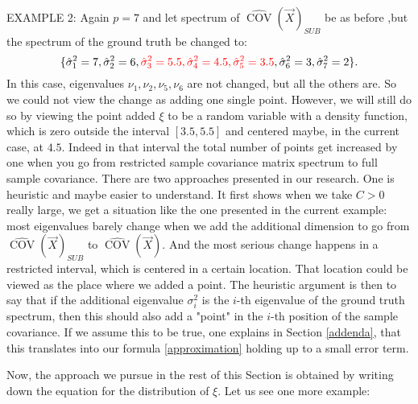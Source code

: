 \documentclass[12pt]{amsart}
\theoremstyle{definition}
\DeclareMathOperator{\Cov}{COV}
\numberwithin{equation}{section}
\numberwithin{equation}{section}
\theoremstyle{remark}
\numberwithin{equation}{section}
\begin{document}
EXAMPLE 2: Again $p=7$ and let spectrum of $\hat{\Cov}(\vec{X})_{SUB}$
be as before ,but the spectrum of the ground truth be changed to:
$$\{\hat{\sigma}^2_1=7,\hat{\sigma}^2_2=6,{\color{red}\hat{\sigma}^2_3=5.5,\hat{\sigma}^2_4=4.5,\hat{\sigma}^2_5=3.5},\hat{\sigma}^2_6=3,\hat{\sigma}^2_7=2\}.$$
In this case, eigenvalues $\nu_1,\nu_2,\nu_5,\nu_6$ are not changed, but all the others are. So we could not view the change as adding one single point. However, we will still do so by viewing the point added $\xi$ to be a random variable with a density function, which is zero outside the interval $[3.5,5.5]$ and centered maybe, in the current case, at $4.5$.  Indeed in that interval the total number of points get increased by one when you go from restricted sample covariance matrix spectrum to full sample covariance.
There are two approaches presented in our research. One is heuristic and maybe easier to understand. It first shows when we take $C>0$ really large, we get a situation like the one presented in the current example: most eigenvalues barely change when we add the additional dimension to go from $\hat{\Cov}(\vec{X})_{SUB}$ to $\hat{\Cov}(\vec{X})$. And the most serious change happens in a restricted interval, which is centered in a certain location.
That location could be viewed as the place where we added a point. The heuristic argument
is then to say that if the additional eigenvalue $\sigma^2_i$ is the $i$-th eigenvalue of the ground truth spectrum, then this should also add a "point" in the $i$-th position of the sample covariance.
If we assume this to be true, one explains in Section \ref{addenda}, that this translates into our formula \ref{approximation} holding up to a small error term.

Now, the approach we pursue in the rest of this Section is obtained by writing down the equation for the distribution of $\xi$. Let us see one more example:
\end{document}
